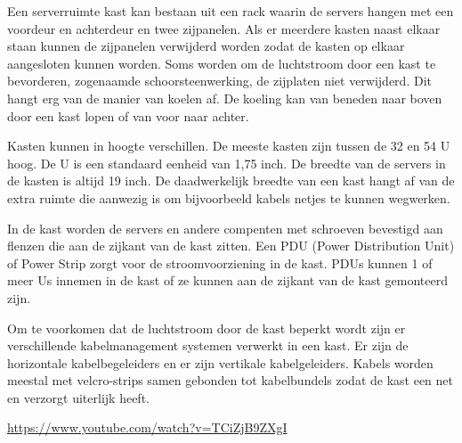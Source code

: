Een serverruimte kast kan bestaan uit een rack waarin de servers hangen met een voordeur en achterdeur en twee zijpanelen. Als er meerdere kasten naast elkaar staan kunnen de zijpanelen verwijderd worden zodat de kasten op elkaar aangesloten kunnen worden. Soms worden om de luchtstroom door een kast te bevorderen, zogenaamde schoorsteenwerking, de zijplaten niet verwijderd. Dit hangt erg van de manier van koelen af. De koeling kan van beneden naar boven door een kast lopen of van voor naar achter.

Kasten kunnen in hoogte verschillen. De meeste kasten zijn tussen de 32 en 54 U hoog. De U is een standaard eenheid van 1,75 inch. De breedte van de servers in de kasten is altijd 19 inch. De daadwerkelijk breedte van een kast hangt af van de extra ruimte die aanwezig is om bijvoorbeeld kabels netjes te kunnen wegwerken.

In de kast worden de servers en andere compenten met schroeven bevestigd aan flenzen die aan de zijkant van de kast zitten. Een PDU (Power Distribution Unit) of Power Strip zorgt voor de stroomvoorziening in de kast. PDUs kunnen 1 of meer Us innemen in de kast of ze kunnen aan de zijkant van de kast gemonteerd zijn.

Om te voorkomen dat de luchtstroom door de kast beperkt wordt zijn er verschillende kabelmanagement systemen verwerkt in een kast. Er zijn de horizontale kabelbegeleiders en er zijn vertikale kabelgeleiders. Kabels worden meestal met velcro-strips samen gebonden tot kabelbundels zodat de kast een net en verzorgt uiterlijk heeft.

\url{https://www.youtube.com/watch?v=TCiZjB9ZXgI}
